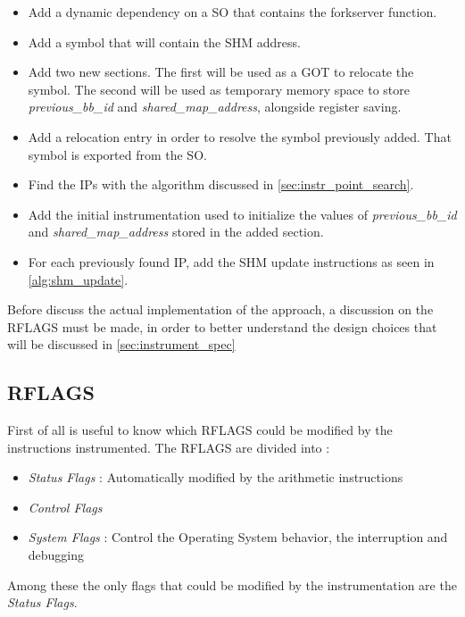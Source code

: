 \begin{itemize}
    \item Add a dynamic dependency on a \gls{SO} that contains the forkserver function.
    \item Add a symbol that will contain the \gls{SHM} address.
    \item Add two new sections. The first will be used as a \gls{GOT} to relocate the symbol. The second will 
        be used as temporary memory space to store \textit{previous\_bb\_id} and \textit{shared\_map\_address}, alongside register saving.
    \item Add a relocation entry in order to resolve the symbol previously added. That symbol is exported from the \gls{SO}.
    \item Find the \gls{IP}s with the algorithm discussed in \cref{sec:instr_point_search}.
    \item Add the initial instrumentation used to initialize the values of 
        \textit{previous\_bb\_id} and \textit{shared\_map\_address} stored in the added section.
    \item For each previously found \gls{IP}, add the \gls{SHM} update instructions as seen in \cref{alg:shm_update}.
\end{itemize}
Before discuss the actual implementation of the approach, a discussion on the RFLAGS must be made, in order to better understand 
the design choices that will be discussed in \cref{sec:instrument_spec}
\subsection{RFLAGS}
    First of all is useful to know which RFLAGS could be modified by the instructions instrumented.
    The RFLAGS are divided into :
    \begin{itemize}
        \item \textit{Status Flags} : Automatically modified by the arithmetic instructions
        \item \textit{Control Flags} 
        \item \textit{System Flags} : Control the Operating System behavior, the interruption and debugging
    \end{itemize}
    Among these the only flags that could be modified by the instrumentation are the \textit{Status Flags}.

